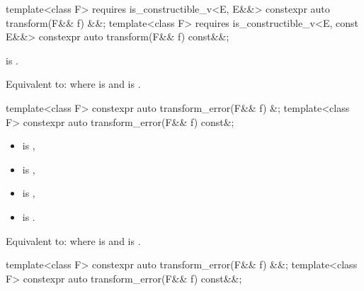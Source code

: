 %
\begin{itemdecl}
template<class F>
  requires is_constructible_v<E, E&&>
constexpr auto transform(F&& f) &&;
template<class F>
  requires is_constructible_v<E, const E&&>
constexpr auto transform(F&& f) const&&;
\end{itemdecl}

\begin{itemdescr}
\pnum
\constraints
{} is .

\pnum
\effects
Equivalent to:  where  is  and  is .
\end{itemdescr}

%
\begin{itemdecl}
template<class F> constexpr auto transform_error(F&& f) &;
template<class F> constexpr auto transform_error(F&& f) const&;
\end{itemdecl}

\begin{itemdescr}
\pnum
\mandates
\begin{itemize}
\item {} is ,
\item {} is ,
\item {} is ,
\item {} is .
\end{itemize}

\pnum
\effects
Equivalent to:  where  is  and  is .
\end{itemdescr}

%
\begin{itemdecl}
template<class F> constexpr auto transform_error(F&& f) &&;
template<class F> constexpr auto transform_error(F&& f) const&&;
\end{itemdecl}

